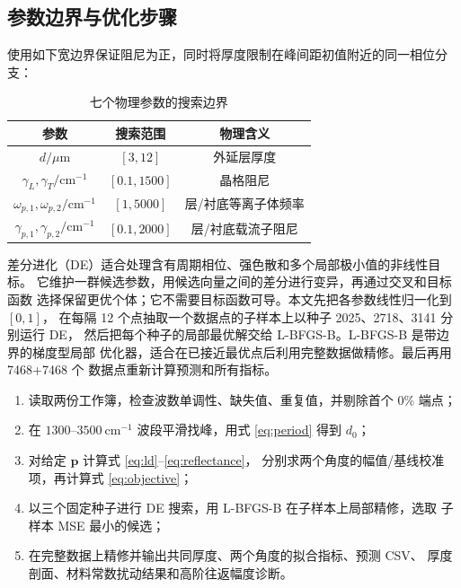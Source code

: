 \documentclass[UTF8,12pt,a4paper]{ctexart}
\begin{document}
\subsection{参数边界与优化步骤}

使用如下宽边界保证阻尼为正，同时将厚度限制在峰间距初值附近的同一相位分支：
\begin{table}[H]
  \centering
  \caption{七个物理参数的搜索边界}
  \label{tab:bounds}
  \small
  \begin{tabular}{ccc}
    \toprule
    参数 & 搜索范围 & 物理含义\\
    \midrule
    $d/\mu\mathrm{m}$ & $[3,12]$ & 外延层厚度\\
    $\gamma_L,\gamma_T/\mathrm{cm}^{-1}$ & $[0.1,1500]$ & 晶格阻尼\\
    $\omega_{p,1},\omega_{p,2}/\mathrm{cm}^{-1}$ & $[1,5000]$ & 层/衬底等离子体频率\\
    $\gamma_{p,1},\gamma_{p,2}/\mathrm{cm}^{-1}$ & $[0.1,2000]$ & 层/衬底载流子阻尼\\
    \bottomrule
  \end{tabular}
\end{table}

差分进化（DE）适合处理含有周期相位、强色散和多个局部极小值的非线性目标。
它维护一群候选参数，用候选向量之间的差分进行变异，再通过交叉和目标函数
选择保留更优个体；它不需要目标函数可导。本文先把各参数线性归一化到 $[0,1]$，
在每隔 12 个点抽取一个数据点的子样本上以种子 2025、2718、3141 分别运行 DE，
然后把每个种子的局部最优解交给 L-BFGS-B。L-BFGS-B 是带边界的梯度型局部
优化器，适合在已接近最优点后利用完整数据做精修。最后再用 7468+7468 个
数据点重新计算预测和所有指标。

\begin{enumerate}[label=步骤\arabic*：,leftmargin=5em]
  \item 读取两份工作簿，检查波数单调性、缺失值、重复值，并剔除首个 0\% 端点；
  \item 在 $1300$--$3500\ \mathrm{cm}^{-1}$ 波段平滑找峰，用式
  \eqref{eq:period} 得到 $d_0$；
  \item 对给定 $\boldsymbol p$ 计算式 \eqref{eq:ld}--\eqref{eq:reflectance}，
  分别求两个角度的幅值/基线校准项，再计算式 \eqref{eq:objective}；
  \item 以三个固定种子进行 DE 搜索，用 L-BFGS-B 在子样本上局部精修，选取
  子样本 MSE 最小的候选；
  \item 在完整数据上精修并输出共同厚度、两个角度的拟合指标、预测 CSV、
  厚度剖面、材料常数扰动结果和高阶往返幅度诊断。
\end{enumerate}
\end{document}
